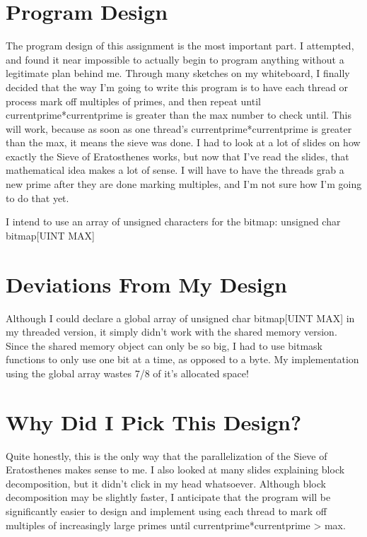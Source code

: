 \documentclass[letterpaper,10pt,titlepage,fleqn]{article}
\begin{document}





\section*{Program Design}
The program design of this assignment is the most important part. I attempted, and found it near impossible to actually begin to program anything without a legitimate plan behind me. Through many sketches on my whiteboard, I finally decided that the way I'm going to write this program is to have each thread or process mark off multiples of primes, and then repeat until currentprime*currentprime is greater than the max number to check until. This will work, because as soon as one thread's currentprime*currentprime is greater than the max, it means the sieve was done. I had to look at a lot of slides on how exactly the Sieve of Eratosthenes works, but now that I've read the slides, that mathematical idea makes a lot of sense. I will have to have the threads grab a new prime after they are done marking multiples, and I'm not sure how I'm going to do that yet.

I intend to use an array of unsigned characters for the bitmap: unsigned char bitmap[UINT MAX]
\section*{Deviations From My Design}
Although I could declare a global array of unsigned char bitmap[UINT MAX] in my threaded version, it simply didn't work with the shared memory version. Since the shared memory object can only be so big, I had to use bitmask functions to only use one bit at a time, as opposed to a byte. My implementation using the global array wastes 7/8 of it's allocated space!
\section*{Why Did I Pick This Design?}
Quite honestly, this is the only way that the parallelization of the Sieve of Eratosthenes makes sense to me. I also looked at many slides explaining block decomposition, but it didn't click in my head whatsoever. Although block decomposition may be slightly faster, I anticipate that the program will be significantly easier to design and implement using each thread to mark off multiples of increasingly large primes until currentprime*currentprime > max. 
\end{document}
